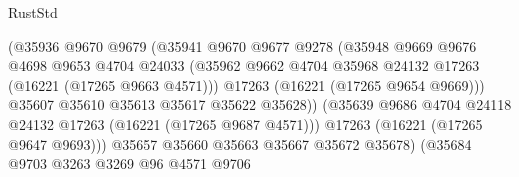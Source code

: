 \begin{lexlean}{RustStd}
\begin{coremodule}
                                        (@35936
                                          @9670
                                          @9679
                                          (@35941
                                            @9670
                                            @9677
                                            @9278
                                            (@35948
                                              @9669
                                              @9676
                                              @4698
                                              @9653
                                              @4704
                                              @24033
                                              (@35962
                                                @9662
                                                @4704
                                                @35968
                                                @24132
                                                @17263
                                                (@16221 (@17265 @9663 @4571)))
                                              @17263
                                              (@16221 (@17265 @9654 @9669)))
                                            @35607
                                            @35610
                                            @35613
                                            @35617
                                            @35622
                                            @35628))
                                        (@35639
                                          @9686
                                          @4704
                                          @24118
                                          @24132
                                          @17263
                                          (@16221 (@17265 @9687 @4571)))
                                        @17263
                                        (@16221 (@17265 @9647 @9693)))
                                      @35657
                                      @35660
                                      @35663
                                      @35667
                                      @35672
                                      @35678)
                                    (@35684
                                      @9703
                                      @3263
                                      @3269
                                      @96
                                      @4571
                                      @9706

\end{coremodule}
\end{lexlean}
